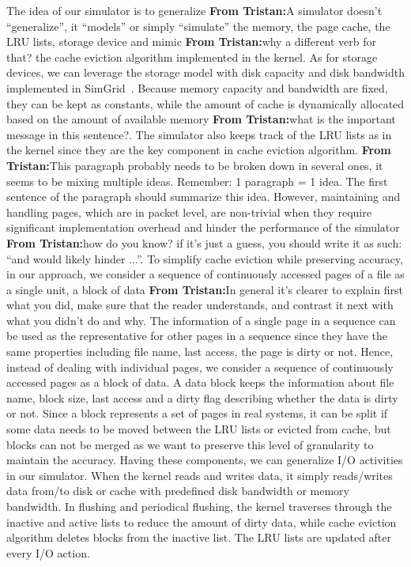 \documentclass[conference]{IEEEtran}
\newcommand{\tristan}[1]{\color{orange}\textbf{From Tristan:}#1\color{black}}
\begin{document}
			The idea of our simulator is to generalize \tristan{A simulator doesn't ``generalize'', it ``models'' or simply ``simulate''}
			 the memory, the page
			cache, the LRU lists, storage device and mimic \tristan{why a different verb for that?} the cache
			eviction algorithm implemented in the kernel. As for storage
			devices, we can leverage the storage model with disk capacity
			and disk bandwidth implemented in SimGrid~\cite{lebre2015}.
			Because memory capacity and bandwidth are fixed, they can be
			kept as constants, while the amount of cache is dynamically
			allocated based on the amount of available memory \tristan{what is the important message in this sentence?}. The
			simulator also keeps track of the LRU lists as in the kernel
			since they are the key component in cache eviction algorithm.
			\tristan{This paragraph probably needs to be broken down in several ones, 
			it seems to be mixing multiple ideas. Remember: 1 paragraph = 1 idea. The first sentence of the
			paragraph should summarize this idea.}
			However, maintaining and handling pages, which are in packet
			level, are non-trivial when they require significant
			implementation overhead and hinder the performance of the
			simulator \tristan{how do you know? if it's just a guess, you should write it as such: ``and would likely hinder ...''}.
			 To simplify cache eviction while preserving
			accuracy, in our approach, we consider a sequence of
			continuously accessed pages of a file as a single unit, a block
			of data \tristan{In general it's clearer to explain first what you did, make sure that the reader understands, and 
			contrast it next with what you didn't do and why}.
			 The information of a single page in a sequence can be
			used as the representative for other pages in a sequence since
			they have the same properties including file name, last access,
			the page is dirty or not. Hence, instead of dealing with
			individual pages, we consider a sequence of continuously
			accessed pages as a block of data. A data block keeps the
			information about file name, block size, last access and a
			dirty flag describing whether the data is dirty or not. Since a
			block represents a set of pages in real systems, it can be
			split if some data needs to be moved between the LRU lists or
			evicted from cache, but blocks can not be merged as we want to
			preserve this level of granularity to maintain the accuracy.
			Having these components, we can generalize I/O activities in
			our simulator. When the kernel reads and writes data, it simply
			reads/writes data from/to disk or cache with predefined disk
			bandwidth or memory bandwidth. In flushing and periodical
			flushing, the kernel traverses through the inactive and active
			lists to reduce the amount of dirty data, while cache eviction
			algorithm deletes blocks from the inactive list. The LRU lists
			are updated after every I/O action.
			
\end{document}
